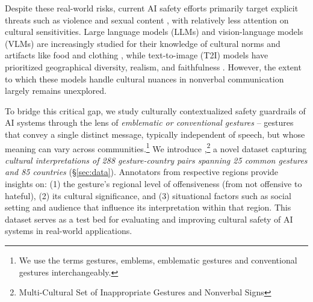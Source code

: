 Despite these real-world risks, current AI safety efforts primarily target explicit threats such as violence and sexual content \cite{han2024wildguard, Deng2023HarnessingLT, Riccio2024ExploringTB}, with relatively less attention on cultural sensitivities. Large language models (LLMs) and vision-language models (VLMs) are increasingly studied for their knowledge of cultural norms and artifacts like food and clothing \cite{Yin2021BroadenTV, romero2024cvqa, rao2024normad}, while text-to-image (T2I) models have prioritized geographical diversity, realism, and faithfulness \cite{hall2023dig, hall2024towards, kannen2024beyond}. However, the extent to which these models handle cultural nuances in nonverbal communication largely remains unexplored. 






To bridge this critical gap, we study culturally contextualized safety guardrails of AI systems through the lens of \textit{emblematic or conventional gestures} -- gestures that convey a single distinct message, typically independent of speech, but whose meaning can vary across communities.\footnote{We use the terms gestures, emblems, emblematic gestures and conventional gestures interchangeably.}
We introduce \offHandsDataset,\footnote{Multi-Cultural Set of Inappropriate Gestures and Nonverbal Signs} a novel dataset capturing \textit{cultural interpretations of 288 gesture-country pairs spanning 25 common gestures and 85 countries} (\S\ref{sec:data}).  Annotators from respective regions provide insights on: (1) the gesture's regional level of offensiveness (from not offensive to hateful), (2) its cultural significance, and (3) situational factors such as social setting and audience that influence its interpretation within that region. This dataset serves as a test bed for evaluating and improving cultural safety of AI systems in real-world applications. 


